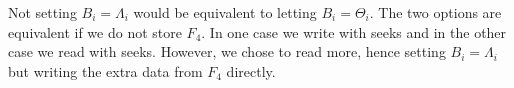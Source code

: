 \documentclass[conference]{IEEEtran}
\begin{document}
  Not setting $B_i = \Lambda_i$ would be equivalent to letting $B_i = \Theta_i$.
  The two options are equivalent if we do not store $F_4$.
  In one case we write with seeks and in the other case we read with seeks.
  However, we chose to read more, hence setting $B_i = \Lambda_i$ but writing the extra data from $F_4$ directly.
\end{document}
